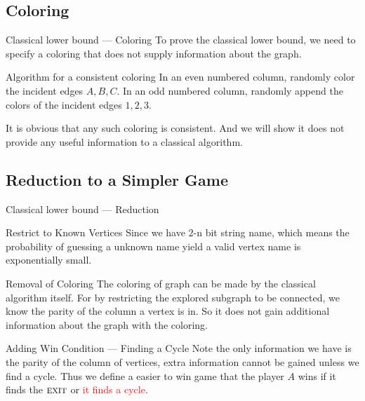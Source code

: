\documentclass{beamer}
\newcommand{\<}{\langle}
\renewcommand{\>}{\rangle}
\newcommand{\exit}{{\textsc{exit}}}
\begin{document}
\subsection{Coloring}\label{classical:coloring}
\begin{frame}{Classical lower bound --- Coloring}
To prove the classical lower bound, we need to specify a coloring that does not supply information about the graph.
\begin{block}{Algorithm for a consistent coloring}
In an even numbered column, randomly color the incident edges $A,B,C$.
In an odd numbered column, randomly append the colors of the incident edges $1,2,3$.
\end{block}
It is obvious that any such coloring is consistent. 
And we will show it does not provide any useful information to a classical algorithm.
\end{frame}

\subsection{Reduction to a Simpler Game}\label{classical:reduction}

\begin{frame}{Classical lower bound --- Reduction}

\begin{block}{Restrict to Known Vertices}
Since we have $2$-n bit string name, which means the probability of guessing a unknown name yield a valid vertex name is exponentially small.
\end{block}

\begin{block}{Removal of Coloring}
The coloring of graph can be made by the classical algorithm itself. 
For by restricting the explored subgraph to be connected, we know the parity of the column a vertex is in.
So it does not gain additional information about the graph with the coloring.
\end{block}

\begin{block}{Adding Win Condition --- Finding a Cycle}
Note the only information we have is the parity of the column of vertices, extra information cannot be gained unless we find a cycle. Thus we define a easier to win game that the player $A$ wins if it finds the $\exit$ or \textcolor{red}{it finds a cycle}. 
\end{block}

\end{frame}
\end{document}
